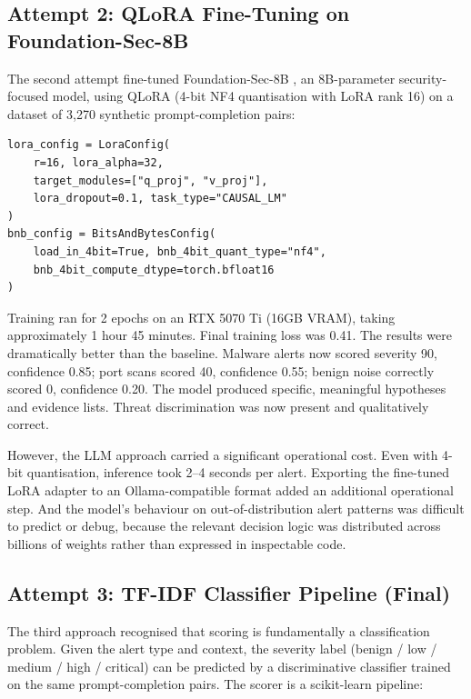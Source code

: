 \subsection{Attempt 2: QLoRA Fine-Tuning on Foundation-Sec-8B}

The second attempt fine-tuned Foundation-Sec-8B \cite{fdtnsec}, an 8B-parameter security-focused model, using QLoRA \cite{dettmers2023qlora} (4-bit NF4 quantisation with LoRA \cite{hu2022lora} rank 16) on a dataset of 3,270 synthetic prompt-completion pairs:

\begin{verbatim}
lora_config = LoraConfig(
    r=16, lora_alpha=32,
    target_modules=["q_proj", "v_proj"],
    lora_dropout=0.1, task_type="CAUSAL_LM"
)
bnb_config = BitsAndBytesConfig(
    load_in_4bit=True, bnb_4bit_quant_type="nf4",
    bnb_4bit_compute_dtype=torch.bfloat16
)
\end{verbatim}

Training ran for 2 epochs on an RTX 5070 Ti (16GB VRAM), taking approximately 1 hour 45 minutes. Final training loss was 0.41. The results were dramatically better than the baseline. Malware alerts now scored severity 90, confidence 0.85; port scans scored 40, confidence 0.55; benign noise correctly scored 0, confidence 0.20. The model produced specific, meaningful hypotheses and evidence lists. Threat discrimination was now present and qualitatively correct.

However, the LLM approach carried a significant operational cost. Even with 4-bit quantisation, inference took 2--4 seconds per alert. Exporting the fine-tuned LoRA adapter to an Ollama-compatible format added an additional operational step. And the model's behaviour on out-of-distribution alert patterns was difficult to predict or debug, because the relevant decision logic was distributed across billions of weights rather than expressed in inspectable code.

\subsection{Attempt 3: TF-IDF Classifier Pipeline (Final)}

The third approach recognised that scoring is fundamentally a classification problem. Given the alert type and context, the severity label (benign / low / medium / high / critical) can be predicted by a discriminative classifier trained on the same prompt-completion pairs. The scorer is a scikit-learn \cite{pedregosa2011sklearn} pipeline:

